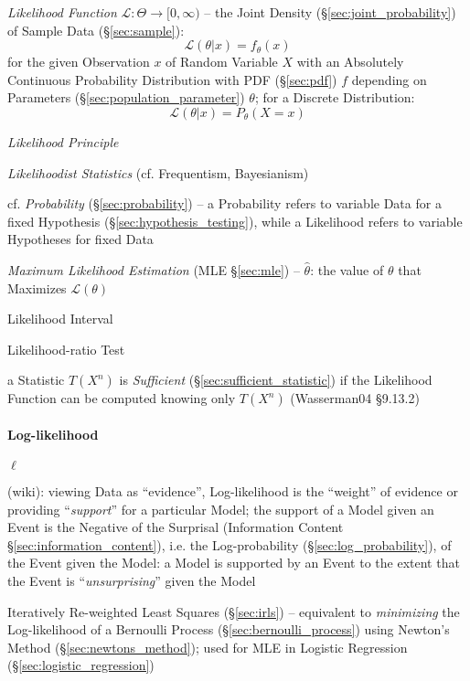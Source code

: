 \emph{Likelihood Function} $\mathcal{L} : \Theta \to [0, \infty)$ -- the
  Joint Density (\S\ref{sec:joint_probability}) of Sample Data
  (\S\ref{sec:sample}):
\[
  \mathcal{L}(\theta | x) = f_\theta(x)
\]
for the given Observation $x$ of Random Variable $X$ with an Absolutely
Continuous Probability Distribution with PDF (\S\ref{sec:pdf}) $f$ depending on
Parameters (\S\ref{sec:population_parameter}) $\theta$; for a Discrete
Distribution:
\[
  \mathcal{L}(\theta | x) = P_\theta(X = x)
\]

\emph{Likelihood Principle}

\emph{Likelihoodist Statistics} (cf. Frequentism, Bayesianism)

cf. \emph{Probability} (\S\ref{sec:probability}) -- a Probability refers to
variable Data for a fixed Hypothesis (\S\ref{sec:hypothesis_testing}), while a
Likelihood refers to variable Hypotheses for fixed Data

\emph{Maximum Likelihood Estimation} (MLE \S\ref{sec:mle}) -- $\hat{\theta}$:
the value of $\theta$ that Maximizes $\mathcal{L}(\theta)$

Likelihood Interval

Likelihood-ratio Test

\fist a Statistic $T(X^n)$ is \emph{Sufficient}
(\S\ref{sec:sufficient_statistic}) if the Likelihood Function can be computed
knowing only $T(X^n)$ (Wasserman04 \S9.13.2)



\paragraph{Log-likelihood}\label{sec:log_likelihood}\hfill

$\ell$

(wiki): viewing Data as ``evidence'', Log-likelihood is the ``weight'' of
evidence or providing ``\emph{support}'' for a particular Model; the support of
a Model given an Event is the Negative of the Surprisal (Information Content
\S\ref{sec:information_content}), i.e. the Log-probability
(\S\ref{sec:log_probability}), of the Event given the Model: a Model is
supported by an Event to the extent that the Event is ``\emph{unsurprising}''
given the Model

Iteratively Re-weighted Least Squares (\S\ref{sec:irls}) -- equivalent to
\emph{minimizing} the Log-likelihood of a Bernoulli Process
(\S\ref{sec:bernoulli_process}) using Newton's Method
(\S\ref{sec:newtons_method}); used for MLE in Logistic Regression
(\S\ref{sec:logistic_regression})


